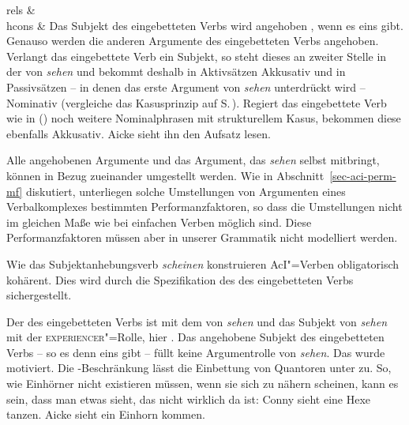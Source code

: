 {{rels & \\[10mm]
hcons & 
        }
\zs{}
Das Subjekt des eingebetteten Verbs wird angehoben , wenn es eins gibt.
Genauso werden die anderen Argumente des eingebetteten Verbs  angehoben.
Verlangt das eingebettete Verb ein Subjekt, so steht dieses an zweiter Stelle in
der \argstl von \emph{sehen} und bekommt deshalb in Aktivsätzen
Akkusativ und in Passivsätzen -- in denen das erste Argument von \emph{sehen} unterdrückt wird -- 
Nominativ (vergleiche das Kasusprinzip auf S.\,\pageref{case-p}). 
Regiert das eingebettete Verb wie in () noch weitere Nominalphrasen mit strukturellem Kasus, bekommen
diese ebenfalls Akkusativ.
\ea
Aicke sieht ihn den Aufsatz lesen.
\z

\noindent
Alle angehobenen Argumente und das Argument, das \emph{sehen} selbst mitbringt,
können in Bezug zueinander umgestellt werden. Wie in Abschnitt~\ref{sec-aci-perm-mf}
diskutiert, unterliegen solche Umstellungen von Argumenten eines Verbalkomplexes
bestimmten Performanzfaktoren, so dass die Umstellungen nicht im gleichen Maße
wie bei einfachen Verben möglich sind. Diese Performanzfaktoren müssen aber in
unserer Grammatik nicht modelliert werden.

Wie das Subjektanhebungsverb \emph{scheinen} konstruieren AcI"=Verben obligatorisch
kohärent. Dies wird durch die Spezifikation des \lexwes des eingebetteten Verbs
sichergestellt.

Der \ltopw des eingebetteten Verbs  ist \qeq mit dem \argtwo von \emph{sehen}
und das Subjekt von \emph{sehen} mit der \textsc{experiencer}"=Rolle, hier \argone {}. Das angehobene
Subjekt des eingebetteten Verbs -- so es denn eins gibt -- füllt keine Argumentrolle von \emph{sehen}. 
Das wurde  motiviert.
Die \qeq\hyp Beschränkung lässt die Einbettung von Quantoren unter  zu. So, wie
Einhörner nicht existieren müssen, wenn sie sich zu nähern scheinen, kann es sein, dass man etwas
sieht, das nicht wirklich da ist:
\eal
\ex Conny sieht eine Hexe tanzen.
\ex Aicke sieht ein Einhorn kommen.
\zl

}
